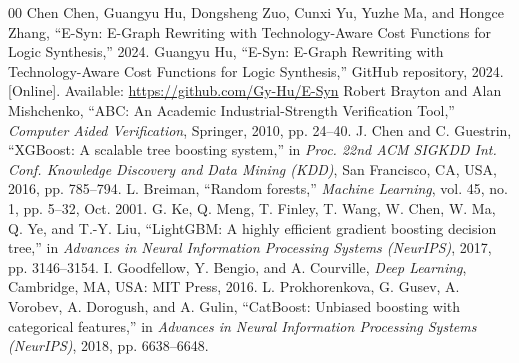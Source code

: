 \documentclass[10pt,twocolumn]{article}
\makeatletter
\renewcommand\section{\@startsection {section}{1}{\z@}%
                                   {-3.5ex \@plus -1ex \@minus -.2ex}%
                                   {2.3ex \@plus.2ex}%
                                   {\normalfont\large\bfseries}}
\makeatother
\begin{document}
\begin{thebibliography}{00}
 Chen Chen, Guangyu Hu, Dongsheng Zuo, Cunxi Yu, Yuzhe Ma, and Hongce Zhang, ``E-Syn: E-Graph Rewriting with Technology-Aware Cost Functions for Logic Synthesis,'' 2024.
 Guangyu Hu, ``E-Syn: E-Graph Rewriting with Technology-Aware Cost Functions for Logic Synthesis,'' GitHub repository, 2024. [Online]. Available: \url{https://github.com/Gy-Hu/E-Syn}
 Robert Brayton and Alan Mishchenko, ``ABC: An Academic Industrial-Strength Verification Tool,'' \textit{Computer Aided Verification}, Springer, 2010, pp. 24--40.
 J. Chen and C. Guestrin, ``XGBoost: A scalable tree boosting system,'' in \textit{Proc. 22nd ACM SIGKDD Int. Conf. Knowledge Discovery and Data Mining (KDD)}, San Francisco, CA, USA, 2016, pp. 785--794.
 L. Breiman, ``Random forests,'' \textit{Machine Learning}, vol. 45, no. 1, pp. 5--32, Oct. 2001.
 G. Ke, Q. Meng, T. Finley, T. Wang, W. Chen, W. Ma, Q. Ye, and T.-Y. Liu, ``LightGBM: A highly efficient gradient boosting decision tree,'' in \textit{Advances in Neural Information Processing Systems (NeurIPS)}, 2017, pp. 3146--3154.
 I. Goodfellow, Y. Bengio, and A. Courville, \textit{Deep Learning}, Cambridge, MA, USA: MIT Press, 2016.
 L. Prokhorenkova, G. Gusev, A. Vorobev, A. Dorogush, and A. Gulin, ``CatBoost: Unbiased boosting with categorical features,'' in \textit{Advances in Neural Information Processing Systems (NeurIPS)}, 2018, pp. 6638--6648.
\end{thebibliography}

\makeatletter
\newcommand{\IEEEPARstart}[2]{#1#2}
\makeatother


\balance
\end{document}
